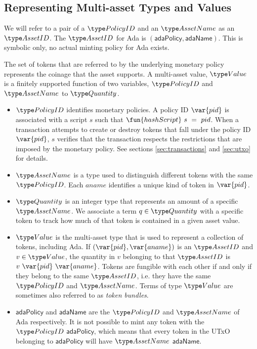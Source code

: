 \subsection*{Representing Multi-asset Types and Values}
We will refer to a pair of a $\PolicyID$ and an
$\AssetName$ as an $\AssetID$. The $\AssetID$ for Ada is $(\mathsf{adaPolicy}, \mathsf{adaName})$.
This is symbolic only, no actual minting policy for Ada exists.

The set of tokens that are referred to by the underlying monetary
policy represents the coinage that the asset supports. A multi-asset
value, $\Value$ is a finitely supported function of two variables,
$\PolicyID$ and $\AssetName$ to $\Quantity$.

\begin{itemize}
  \item $\PolicyID$ identifies monetary policies. A policy ID $\var{pid}$ is associated with a script
    $s$ such that $\fun{hashScript}~s~=~pid$. When a transaction attempts to create or destroy tokens
    that fall under the policy ID $\var{pid}$,
    $s$ verifies that the transaction
    respects the restrictions that are imposed by the monetary policy.
    See sections \ref{sec:transactions} and \ref{sec:utxo} for details.

  \item $\AssetName$ is a type used to distinguish different tokens with the same $\PolicyID$.
    Each $aname$ identifies a unique kind of token in $\var{pid}$.

  \item $\Quantity$ is an integer type that represents an amount of a specific $\AssetName$. We associate
    a term $q\in\Quantity$ with a specific token to track how much of that token is contained in a given asset value.

  \item $\Value$ is the multi-asset type that is used to represent
    a collection of tokens, including Ada. If $(\var{pid}, \var{aname})$ is an $\AssetID$ and $v \in \Value$,
    the quantity in $v$ belonging to that $\AssetID$ is $v~\var{pid}~\var{aname}$.
    Tokens are fungible with each other if and only if they belong to the same $\AssetID$,
    i.e. they have the same $\PolicyID$ and $\AssetName$. Terms of type $\Value$ are sometimes also referred to as
    \emph{token bundles}.

  \item $\mathsf{adaPolicy}$ and $\mathsf{adaName}$ are the $\PolicyID$ and $\AssetName$ of Ada respectively.
    It is not possible to mint any token with the $\PolicyID$ $\mathsf{adaPolicy}$, which means that every
    token in the UTxO belonging to $\mathsf{adaPolicy}$ will have $\AssetName$ $\mathsf{adaName}$.


\end{itemize}
